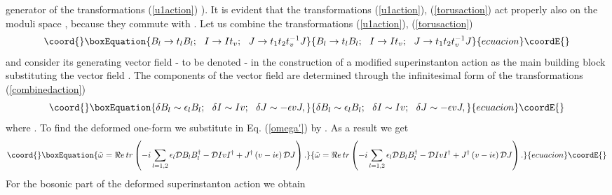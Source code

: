\documentclass[a4paper,12pt]{article}
\begin{document}
generator of the transformations (\ref{u1action}) ). It is evident
that the transformations (\ref{u1action}), (\ref{torusaction}) act
properly also on the moduli space \coordHE{}, because they
commute with \coordHE{}. Let us combine the transformations
(\ref{u1action}), (\ref{torusaction})
\begin{equation}\coord{}\boxEquation{
B_l\rightarrow t_l B_l ; \, \, \, \, I\rightarrow It_v; \, \, \,
\, J\rightarrow t_1 t_2 t_v^{-1}J
\label{combinedaction}
}{
B_l\rightarrow t_l B_l ; \, \, \, \, I\rightarrow It_v; \, \, \,
\, J\rightarrow t_1 t_2 t_v^{-1}J
}{ecuacion}\coordE{}\end{equation}
and consider its generating vector field - to be denoted \coordHE{} - in the construction of a modified superinstanton action as
the main building block substituting the vector field \coordHE{}. The
components of the vector field \coordHE{} are determined through
the infinitesimal form of the transformations
(\ref{combinedaction})
\begin{equation}\coord{}\boxEquation{
\delta B_l\sim \epsilon_l B_l ; \, \, \, \, \delta I\sim Iv; \, \,
\, \, \delta J\sim -\epsilon vJ, \label{tildex}
}{
\delta B_l\sim \epsilon_l B_l ; \, \, \, \, \delta I\sim Iv; \, \,
\, \, \delta J\sim -\epsilon vJ, }{ecuacion}\coordE{}\end{equation}
where \coordHE{}. To find the deformed
one-form \myHighlight{${\tilde \omega}$}\coordHE{} we substitute in Eq. (\ref{omega'}) \coordHE{}
by \coordHE{}. As a result we get
\begin{equation}\coord{}\boxEquation{
{\tilde \omega} =\Re e \, tr\left(-i\sum_{l=1,2}\epsilon_l {\cal
D}B_l B_l^{\dagger}-{\cal D}I v
I^{\dagger}+J^{\dagger}\left(v-i\epsilon \right){\cal D}J\right).
}{
{\tilde \omega} =\Re e \, tr\left(-i\sum_{l=1,2}\epsilon_l {\cal
D}B_l B_l^{\dagger}-{\cal D}I v
I^{\dagger}+J^{\dagger}\left(v-i\epsilon \right){\cal D}J\right).
}{ecuacion}\coordE{}\end{equation}
For the bosonic part of the deformed superinstanton action \coordHE{} we obtain
\end{document}
